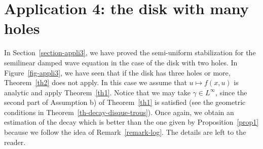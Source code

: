 \documentclass[AHL,Unicode,longabstracts]{cedram}
\begin{document}
\section{Application 4: the disk with many holes}\label{section-appli4}

In Section~\ref{section-appli3}, we have proved the semi-uniform stabilization for the semilinear damped wave equation in the case of the disk with two holes. In Figure~\ref{fig-appli3}, we have seen that if the disk has three holes or more, Theorem~\ref{th2} does not apply. In this case we assume that $u\mapsto f(x,u)$ is analytic and apply Theorem~\ref{th1}. Notice that we may take $\gamma\in L^\infty$, since the second part of Assumption b) of Theorem~\ref{th1} is satisfied (see the geometric conditions in Theorem~\ref{th-decay-disque-trous}). Once again, we obtain an estimation of the decay which is better than the one given by Proposition~\ref{prop1} because we follow the idea of Remark~\ref{remark-log}. The details are left to the reader.
\end{document}
